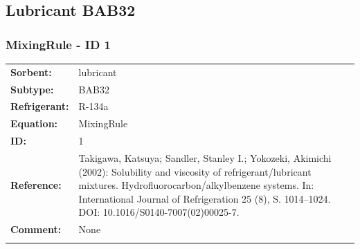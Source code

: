 \subsection{Lubricant BAB32}
%
\subsubsection{MixingRule - ID 1}
%
\begin{tabular}[l]{|lp{11.5cm}|}
\hline
\addlinespace

\textbf{Sorbent:} & lubricant \\
\textbf{Subtype:} & BAB32 \\
\textbf{Refrigerant:} & R-134a \\
\textbf{Equation:} & MixingRule \\
\textbf{ID:} & 1 \\
\textbf{Reference:} & Takigawa, Katsuya; Sandler, Stanley I.; Yokozeki, Akimichi (2002): Solubility and viscosity of refrigerant/lubricant mixtures. Hydrofluorocarbon/alkylbenzene systems. In: International Journal of Refrigeration 25 (8), S. 1014–1024. DOI: 10.1016/S0140-7007(02)00025-7. \\
\textbf{Comment:} & None \\

\addlinespace
\hline
\end{tabular}
\newline


